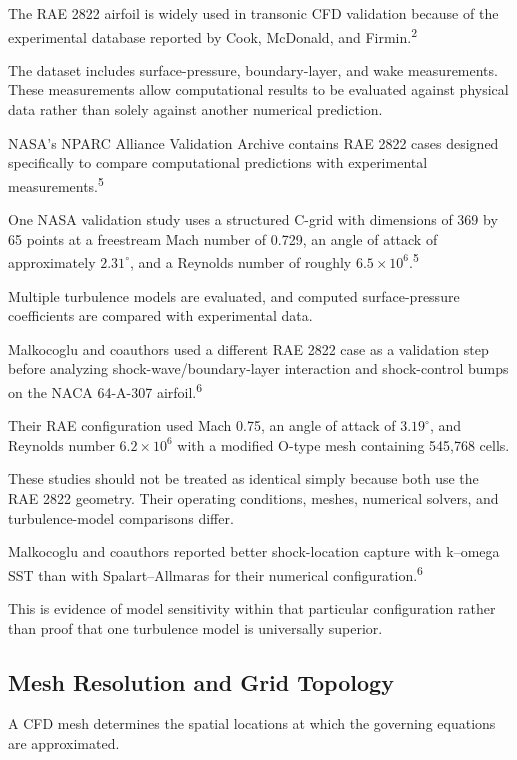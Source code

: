 \documentclass[10pt]{article}
\newcommand{\supercite}[1]{\textsuperscript{#1}}
\begin{document}
The RAE 2822 airfoil is widely used in transonic CFD validation because
of the experimental database reported by Cook, McDonald, and
Firmin.\supercite{2}

The dataset includes surface-pressure, boundary-layer, and wake
measurements. These measurements allow computational results to be
evaluated against physical data rather than solely against another
numerical prediction.

NASA's NPARC Alliance Validation Archive contains RAE 2822 cases
designed specifically to compare computational predictions with
experimental measurements.\supercite{5}

One NASA validation study uses a structured C-grid with dimensions of
369 by 65 points at a freestream Mach number of 0.729, an angle of
attack of approximately $2.31^\circ$, and a Reynolds number of roughly
$6.5\times10^6$.\supercite{5}

Multiple turbulence models are evaluated, and computed surface-pressure
coefficients are compared with experimental data.

Malkocoglu and coauthors used a different RAE 2822 case as a validation
step before analyzing shock-wave/boundary-layer interaction and
shock-control bumps on the NACA 64-A-307 airfoil.\supercite{6}

Their RAE configuration used Mach 0.75, an angle of attack of
$3.19^\circ$, and Reynolds number $6.2\times10^6$ with a modified
O-type mesh containing 545,768 cells.

These studies should not be treated as identical simply because both
use the RAE 2822 geometry. Their operating conditions, meshes, numerical
solvers, and turbulence-model comparisons differ.

Malkocoglu and coauthors reported better shock-location capture with
k--omega SST than with Spalart--Allmaras for their numerical
configuration.\supercite{6}

This is evidence of model sensitivity within that particular
configuration rather than proof that one turbulence model is universally
superior.


\subsection{Mesh Resolution and Grid Topology}

A CFD mesh determines the spatial locations at which the governing
equations are approximated.
\end{document}
